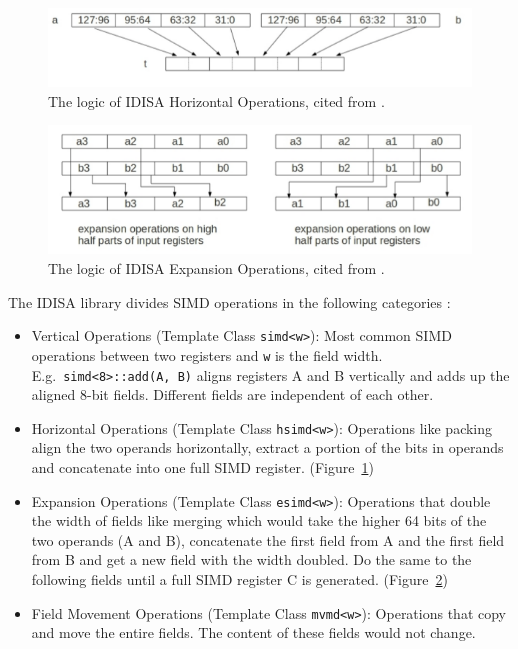 \begin{figure}[ht!]
\centering
\includegraphics[width=130mm]{draw/horizontal.png}
\caption[Horizontal Operations in IDISA]{The logic of IDISA Horizontal Operations, cited from \cite{hua_idisa}.}
\label{figure:horizontal}
\end{figure}

\begin{figure}[ht!]
\centering
\includegraphics[width=130mm]{draw/expansion.png}
\caption[Expansion Operations in IDISA]{The logic of IDISA Expansion Operations, cited from \cite{hua_idisa}.}
\label{figure:expansion}
\end{figure}

The IDISA library divides SIMD operations in the following categories \cite{idisa_webpage}:
\begin{itemize}
    \item Vertical Operations (Template Class {\tt simd<w>}): Most common SIMD operations between two registers and {\tt w} is the field width. E.g.\ {\tt simd<8>::add(A, B)} aligns registers A and B vertically and adds up the aligned 8-bit fields. Different fields are independent of each other.
    \item Horizontal Operations (Template Class {\tt hsimd<w>}): Operations like packing align the two operands horizontally, extract a portion of the bits in operands and concatenate into one full SIMD register. (Figure~\ref{figure:horizontal})
    \item Expansion Operations (Template Class {\tt esimd<w>}): Operations that double the width of fields like merging which would take the higher 64 bits of the two operands (A and B), concatenate the first field from A and the first field from B and get a new field with the width doubled. Do the same to the following fields until a full SIMD register C is generated. (Figure~\ref{figure:expansion})
    \item Field Movement Operations (Template Class {\tt mvmd<w>}): Operations that copy and move the entire fields. The content of these fields would not change.
\end{itemize}

